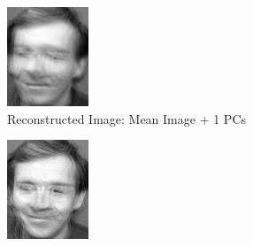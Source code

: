 \documentclass[12pt]{article}
\begin{document}
\begin{figure}
\begin{subfigure}[b]{0.20\textwidth}
		\includegraphics[width=\textwidth]{Task4.3_Images/ReconstructedImage1.jpg}
		\caption{Reconstructed Image: Mean Image + 1 PCs}
	\end{subfigure}\quad
	\begin{subfigure}[b]{0.20\textwidth}
		\includegraphics[width=\textwidth]{Task4.3_Images/ReconstructedImage2.jpg}

\end{subfigure}
\end{figure}
\end{document}
